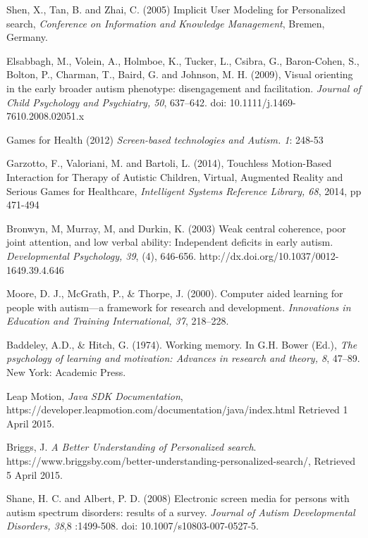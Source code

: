 \documentclass[a4paper, 11pt]{article}
\begin{document}
\begin{thebibliography}{100}
Shen, X., Tan, B. and Zhai, C. (2005) Implicit User Modeling for Personalized search, \textit{Conference on Information and Knowledge Management}, Bremen, Germany.

Elsabbagh, M., Volein, A., Holmboe, K., Tucker, L., Csibra, G., Baron-Cohen, S., Bolton, P., Charman, T., Baird, G. and Johnson, M. H. (2009), Visual orienting in the early broader autism phenotype: disengagement and facilitation. \textit{Journal of Child Psychology and Psychiatry, 50}, 637–642. doi: 10.1111/j.1469-7610.2008.02051.x

 Games for Health (2012) \textit{Screen-based technologies and Autism. 1}: 248-53

 Garzotto, F., Valoriani, M. and Bartoli, L. (2014), Touchless Motion-Based Interaction for Therapy of Autistic Children, Virtual, Augmented Reality and Serious Games for Healthcare, \textit{Intelligent Systems Reference Library, 68}, 2014, pp 471-494

 Bronwyn, M, Murray, M, and Durkin, K. (2003) Weak central coherence, poor joint attention, and low verbal ability: Independent deficits in early autism. \textit{Developmental Psychology, 39}, (4), 646-656. http://dx.doi.org/10.1037/0012-1649.39.4.646

Moore, D. J., McGrath, P., \& Thorpe, J. (2000). Computer aided learning for people with autism—a framework for research and development. \textit{Innovations in Education and Training International, 37}, 218–228.

Baddeley, A.D., \& Hitch, G. (1974). Working memory. In G.H. Bower (Ed.), \textit{The psychology of learning and motivation: Advances in research and theory, 8}, 47–89. New York: Academic Press.

 Leap Motion, \textit{Java SDK Documentation}, \\https://developer.leapmotion.com/documentation/java/index.html Retrieved 1 April 2015.

Briggs, J. \textit{A Better Understanding of Personalized search}. https://www.briggsby.com/better-understanding-personalized-search/, Retrieved 5 April 2015.

Shane, H. C. and Albert, P. D. (2008) Electronic screen media for persons with autism spectrum disorders: results of a survey. \textit{Journal of Autism Developmental Disorders, 38},8 :1499-508. doi: 10.1007/s10803-007-0527-5.


\end{thebibliography}
\end{document}
